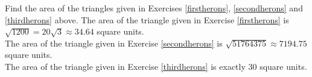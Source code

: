 { Find the area of the triangles given in Exercises \ref{firstherons}, \ref{secondherons} and \ref{thirdherons} above.}
{ The area of the triangle given in Exercise \ref{firstherons} is $\sqrt{1200} = 20\sqrt{3} \approx 34.64$ square units.\\ The area of the triangle given in Exercise \ref{secondherons} is $\sqrt{51764375} \approx 7194.75$ square units.\\ The area of the triangle given in Exercise \ref{thirdherons} is exactly $30$ square units.}
